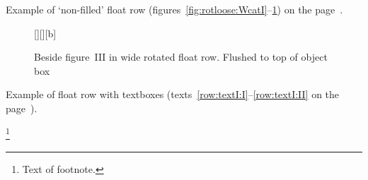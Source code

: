 \Text
\Text

\clearpage
Example of `non-filled' float row
(figures~\ref{fig:rotloose:WcatI}--\ref{fig:rotloose:mouseI}) on the page~\pageref{fig:rotloose:WcatI}.

\begin{figure}
\wideemptyfloatpage\CADJtrue
\begin{floatrow}[3]
{\caption{Beside figure~I in wide rotated float row. Vertically centered}%
\label{fig:rotloose:WcatI}}%

[\FBwidth][][b]
{\caption{Beside figure~II in wide rotated float row. Flushed to bottom of box}%
\label{fig:rotloose:BcatI}%
%
}%
{\unitlength\ifx\pspicture\undefined\else{}\fi
 }%

{\caption{Beside figure~III in wide rotated float row. Flushed to top of object box}%
\label{fig:rotloose:mouseI}}%
\end{floatrow}
\end{figure}

\Text
\Text

\Text
\Text

\clearpage
Example of float row with textboxes (texts~\ref{row:textI:I}--\ref{row:textI:II} on the page~\pageref{row:textI:II}).

\begin{sidewaystextbox*}
\wideemptyfloatpage
\begin{floatrow}
\ttextbox
{\TEXTBOX\par\TEXTBOX\footnote
{Text of footnote. \text}}
{\caption{Beside text~I. \text}%
\label{row:textI:I}}%

{\caption{Beside text~II}%
\label{row:textI:II}%
%
}%
{\TEXTBOX[ \text.]}%
\end{floatrow}
\end{sidewaystextbox*}

\Text \Text \Text

\Text \Text

